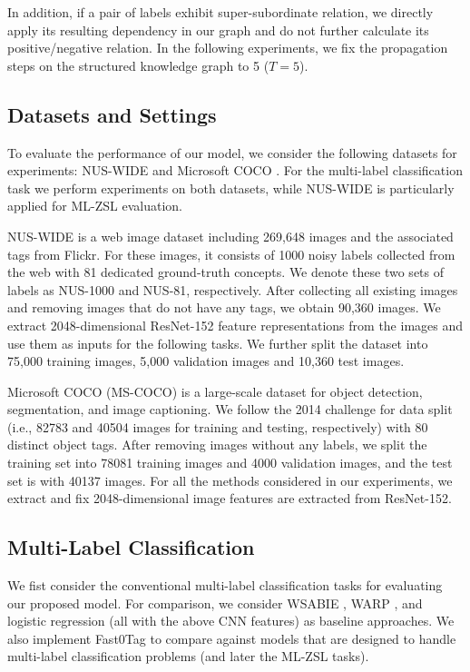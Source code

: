 \documentclass[10pt,twocolumn,letterpaper]{article}
\begin{document}
In addition, if a pair of labels exhibit super-subordinate relation, we directly apply its resulting dependency in our graph and do not further calculate its positive/negative relation. In the following experiments, we fix the propagation steps on the structured knowledge graph to 5 ($T=5$).

\subsection{Datasets and Settings}
To evaluate the performance of our model, we consider the following datasets for experiments: NUS-WIDE \cite{chua2009nus} and Microsoft COCO \cite{502}. For the multi-label classification task we perform experiments on both datasets, while NUS-WIDE is particularly applied for ML-ZSL evaluation. 

NUS-WIDE is a web image dataset including 269,648 images and the associated tags from Flickr. For these images, it consists of 1000 noisy labels collected from the web with 81 dedicated ground-truth concepts. We denote these two sets of labels as NUS-1000 and NUS-81, respectively. After collecting all existing images and removing images that do not have any tags, we obtain 90,360 images. We extract 2048-dimensional ResNet-152 \cite{He_2016_CVPR} feature representations from the images and use them as inputs for the following tasks. We further split the dataset into 75,000 training images, 5,000 validation images and 10,360 test images.

Microsoft COCO (MS-COCO) is a large-scale dataset for object detection, segmentation, and image captioning. We follow the 2014 challenge for data split (i.e., 82783 and 40504 images for training and testing, respectively) with 80 distinct object tags. After removing images without any labels, we split the training set into 78081 training images and 4000 validation images, and the test set is with 40137 images. For all the methods considered in our experiments, we extract and fix 2048-dimensional image features are extracted from ResNet-152.

\subsection{Multi-Label Classification}
We fist consider the conventional multi-label classification tasks for evaluating our proposed model.
For comparison, we consider WSABIE \cite{weston2011wsabie}, WARP \cite{DBLP:journals/corr/GongJLTI13}, and logistic regression (all with the above CNN features) as baseline approaches. We also implement Fast0Tag \cite{Zhang_2016_CVPR} to compare against models that are designed to handle multi-label classification problems (and later the ML-ZSL tasks).%
\end{document}
